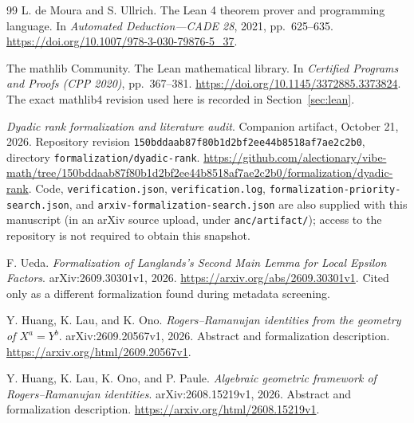 \documentclass[11pt]{article}
\theoremstyle{definition}
\begin{document}
\begin{thebibliography}{99}
 L. de Moura and S. Ullrich.
The Lean 4 theorem prover and programming language.
In \emph{Automated Deduction---CADE 28}, 2021, pp.~625--635.
\url{https://doi.org/10.1007/978-3-030-79876-5_37}.

 The mathlib Community.
The Lean mathematical library.
In \emph{Certified Programs and Proofs (CPP 2020)}, pp.~367--381.
\url{https://doi.org/10.1145/3372885.3373824}.
The exact mathlib4 revision used here is recorded in Section~\ref{sec:lean}.

 \emph{Dyadic rank formalization and literature audit}.
Companion artifact, October 21, 2026. Repository revision
\texttt{150bddaab87f80b1d2bf2ee44b8518af7ae2c2b0}, directory \texttt{formalization/dyadic-rank}.
\url{https://github.com/alectionary/vibe-math/tree/150bddaab87f80b1d2bf2ee44b8518af7ae2c2b0/formalization/dyadic-rank}.
Code, \texttt{verification.json}, \texttt{verification.log},
\texttt{formalization-priority-search.json}, and \texttt{arxiv-formalization-search.json}
are also supplied with this manuscript (in an arXiv source upload, under \texttt{anc/artifact/}); access to the repository is not required to obtain this snapshot.

 F. Ueda.
\emph{Formalization of Langlands's Second Main Lemma for Local Epsilon Factors}.
arXiv:2609.30301v1, 2026.
\url{https://arxiv.org/abs/2609.30301v1}.
Cited only as a different formalization found during metadata screening.

 Y. Huang, K. Lau, and K. Ono.
\emph{Rogers--Ramanujan identities from the geometry of $X^a=Y^b$}.
arXiv:2609.20567v1, 2026. Abstract and formalization description.
\url{https://arxiv.org/html/2609.20567v1}.

 Y. Huang, K. Lau, K. Ono, and P. Paule.
\emph{Algebraic geometric framework of Rogers--Ramanujan identities}.
arXiv:2608.15219v1, 2026. Abstract and formalization description.
\url{https://arxiv.org/html/2608.15219v1}.
\end{thebibliography}

\clearpage
\appendix
\end{document}
